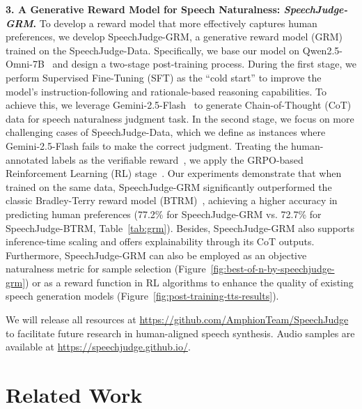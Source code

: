 \documentclass[]{bytedance_seed}
\begin{document}
\textbf{3. A Generative Reward Model for Speech Naturalness: \textit{SpeechJudge-GRM}.}
To develop a reward model that more effectively captures human preferences, we develop SpeechJudge-GRM, a generative reward model (GRM)~\citep{google-grm,deepseek-grm} trained on the SpeechJudge-Data. Specifically, we base our model on Qwen2.5-Omni-7B~\citep{qwen2.5-omni} and design a two-stage post-training process. During the first stage, we perform Supervised Fine-Tuning (SFT) as the ``cold start'' to improve the model's instruction-following and rationale-based reasoning capabilities. To achieve this, we leverage Gemini-2.5-Flash~\citep{gemini2.5} to generate Chain-of-Thought (CoT) data for speech naturalness judgment task. In the second stage, we focus on more challenging cases of SpeechJudge-Data, which we define as instances where Gemini-2.5-Flash fails to make the correct judgment. Treating the human-annotated labels as the verifiable reward~\citep{deepseek-r1,deepseek-grm}, we apply the GRPO-based Reinforcement Learning (RL) stage~\citep{grpo}. Our experiments demonstrate that when trained on the same data, SpeechJudge-GRM significantly outperformed the classic Bradley-Terry reward model (BTRM)~\citep{bt-rm,dpo}, achieving a higher accuracy in predicting human preferences (77.2\% for SpeechJudge-GRM vs. 72.7\% for SpeechJudge-BTRM, Table~\ref{tab:grm}). Besides, SpeechJudge-GRM also supports inference-time scaling and offers explainability through its CoT outputs. Furthermore, SpeechJudge-GRM can also be employed as an objective naturalness metric for sample selection (Figure~\ref{fig:best-of-n-by-speechjudge-grm}) or as a reward function in RL algorithms to enhance the quality of existing speech generation models (Figure~\ref{fig:post-training-tts-results}).

We will release all resources at \url{https://github.com/AmphionTeam/SpeechJudge} to facilitate future research in human-aligned speech synthesis. Audio samples are available at \url{https://speechjudge.github.io/}.

\section{Related Work}
\end{document}
